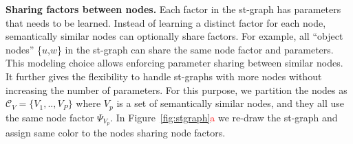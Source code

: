 \documentclass[10pt,twocolumn,letterpaper]{article}
\newcommand{\mcal}[1]{\mathcal{#1}}
\newcommand{\rc}[1]{\textcolor{red}{#1}}
\begin{document}
\fi\textbf{Sharing factors between nodes.}
Each factor in the st-graph has parameters that needs to be learned. Instead of learning a distinct factor for each node, semantically similar nodes can optionally share factors. For example, all ``object nodes'' \{$u$,$w$\} in the st-graph can share the same node factor and parameters. This modeling choice allows enforcing parameter sharing between similar nodes.
It further gives the flexibility to handle st-graphs with more nodes without increasing the number of parameters. For this purpose, we partition the nodes as $\mcal{C}_V=\{V_1,..,V_P\}$ where $V_p$ is a set of semantically similar nodes, and they all use the same node factor $\Psi_{V_p}$. In Figure~\ref{fig:stgraph}\rc{a} we re-draw the st-graph and assign same color to the nodes sharing node factors. 
\end{document}
